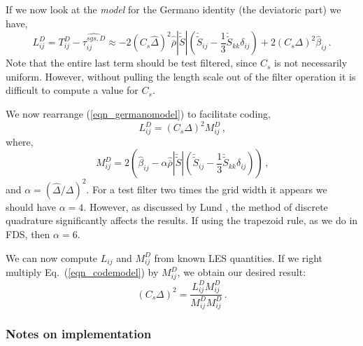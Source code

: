 If we now look at the \emph{model} for the Germano identity (the deviatoric part) we have,
\begin{equation}
\label{eqn_germanomodel}
L_{ij}^D = T_{ij}^D - \widehat{\tau_{ij}^{sgs,D}} \approx - 2\left(C_s \widehat{\Delta}\right)^2 \widehat{\overline{\rho}} |\breve{\widetilde{S}}| \left( \breve{\widetilde{S}}_{ij} - \frac{1}{3} \breve{\widetilde{S}}_{kk} \delta_{ij} \right) +  2 \left(C_s \Delta \right)^2 \widehat{\beta}_{ij} \,\mbox{.}
\end{equation}
Note that the entire last term should be test filtered, since $C_s$ is not necessarily uniform.  However, without pulling the length scale out of the filter operation it is difficult to compute a value for $C_s$.

We now rearrange (\ref{eqn_germanomodel}) to facilitate coding,
\begin{equation}
\label{eqn_codemodel}
L_{ij}^D = \left(C_s \Delta\right)^2 M_{ij}^D \,\mbox{,}
\end{equation}
where,
\begin{equation}
\label{eqn_Mij}
M_{ij}^D = 2\left(\widehat{\beta}_{ij} - \alpha \widehat{\overline{\rho}} |\breve{\widetilde{S}}| \left( \breve{\widetilde{S}}_{ij} - \frac{1}{3}\breve{\widetilde{S}}_{kk} \delta_{ij} \right) \right) \,\mbox{,}
\end{equation}
and $\alpha = (\widehat{\Delta}/\Delta)^2$.  For a test filter two times the grid width it appears we should have $\alpha = 4$.  However, as discussed by Lund \cite{Lund:1997}, the method of discrete quadrature significantly affects the results. If using the trapezoid rule, as we do in FDS, then $\alpha = 6$.

We can now compute $L_{ij}$ and $M_{ij}^D$ from known LES quantities.  If we right multiply Eq.~(\ref{eqn_codemodel}) by $M_{ij}^D$, we obtain our desired result:
\begin{equation}
\label{eqn_lengthscale}
\left(C_s \Delta\right)^2 = \frac{ L_{ij}^D M_{ij}^D }{ M_{ij}^D M_{ij}^D } \,\mbox{.}
\end{equation}

\subsubsection{Notes on implementation}

